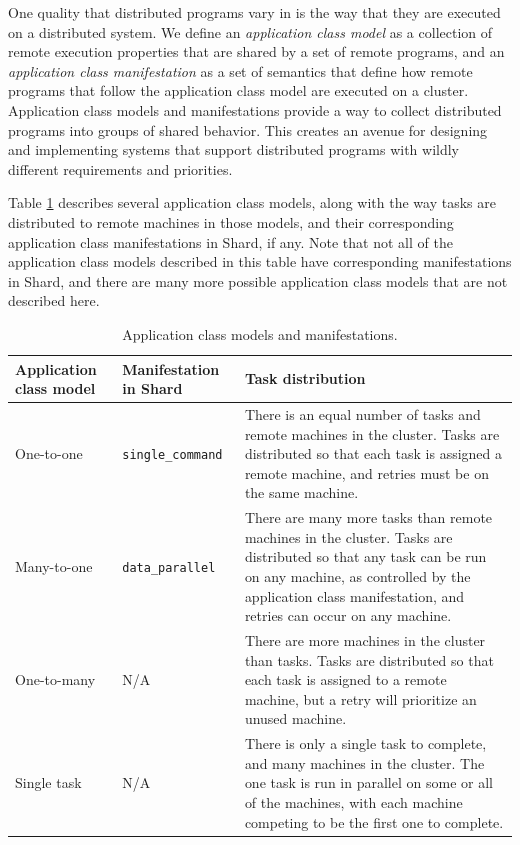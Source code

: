 \documentclass[oneside]{report}
\begin{document}
One quality that distributed programs vary in is the way that they are executed on a distributed system.
We define an \textit{application class model} as a collection of remote execution properties that are shared by a set of remote programs, and an \textit{application class manifestation} as a set of semantics that define how remote programs that follow the application class model are executed on a cluster.
Application class models and manifestations provide a way to collect distributed programs into groups of shared behavior.
This creates an avenue for designing and implementing systems that support distributed programs with wildly different requirements and priorities.

Table \ref{fig:application_class_models} describes several application class models, along with the way tasks are distributed to remote machines in those models, and their corresponding application class manifestations in Shard, if any.
Note that not all of the application class models described in this table have corresponding manifestations in Shard, and there are many more possible application class models that are not described here.

\begin{table}[h]
  \begin{center}
    \begin{tabularx}{\textwidth}{|l|l|X|}
      \hline
      Application class model & Manifestation in Shard   & Task distribution
      \\ \hline
      One-to-one              & \texttt{single\_command} & There is an equal number of tasks and remote machines in the cluster. Tasks are distributed so that each task is assigned a remote machine, and retries must be on the same machine.
      \\ \hline
      Many-to-one             & \texttt{data\_parallel}  & There are many more tasks than remote machines in the cluster. Tasks are distributed so that any task can be run on any machine, as controlled by the application class manifestation, and retries can occur on any machine.
      \\ \hline
      One-to-many             & N/A                      & There are more machines in the cluster than tasks.
      Tasks are distributed so that each task is assigned to a remote machine, but a retry will prioritize an unused machine.
      \\ \hline
      Single task             & N/A                      & There is only a single task to complete, and many machines in the cluster. The one task is run in parallel on some or all of the machines, with each machine competing to be the first one to complete.
      \\ \hline
    \end{tabularx}
    \caption{Application class models and manifestations.}
    \label{fig:application_class_models}
  \end{center}
\end{table}
\end{document}
